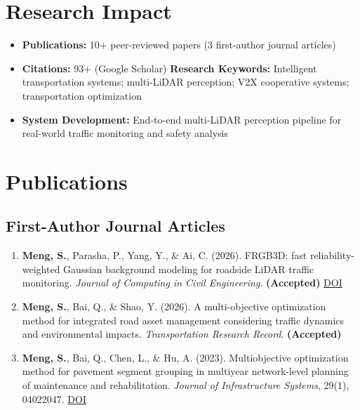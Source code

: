 \documentclass[11pt,a4paper]{article}
\begin{document}
\section*{Research Impact}
\begin{itemize}[leftmargin=1.2em]
\item \textbf{Publications:} 10+ peer-reviewed papers (3 first-author journal articles)
\item \textbf{Citations:} 93+ (Google Scholar)
\textbf{Research Keywords:} Intelligent transportation systems; multi-LiDAR perception; V2X cooperative systems; transportation optimization
\item \textbf{System Development:} End-to-end multi-LiDAR perception pipeline for real-world traffic monitoring and safety analysis
\end{itemize}

\section*{Publications}

\subsection*{First-Author Journal Articles}
\begin{enumerate}[leftmargin=1.2em]
    \item \textbf{Meng, S.}, Parasha, P., Yang, Y., \& Ai, C. (2026). FRGB3D: fast reliability-weighted Gaussian background modeling for roadside LiDAR traffic monitoring. \textit{Journal of Computing in Civil Engineering}. \textbf{(Accepted)} \href{https://doi.org/10.1061/JCCEE5/CPENG-7710}{DOI}
    \item \textbf{Meng, S.}, Bai, Q., \& Shao, Y. (2026). A multi-objective optimization method for integrated road asset management considering traffic dynamics and environmental impacts. \textit{Transportation Research Record}. \textbf{(Accepted)}
    \item \textbf{Meng, S.}, Bai, Q., Chen, L., \& Hu, A. (2023). Multiobjective optimization method for pavement segment grouping in multiyear network-level planning of maintenance and rehabilitation. \textit{Journal of Infrastructure Systems}, 29(1), 04022047. \href{https://doi.org/10.1061/JITSE4.ISENG-2175}{DOI}
\end{enumerate}
\end{document}
